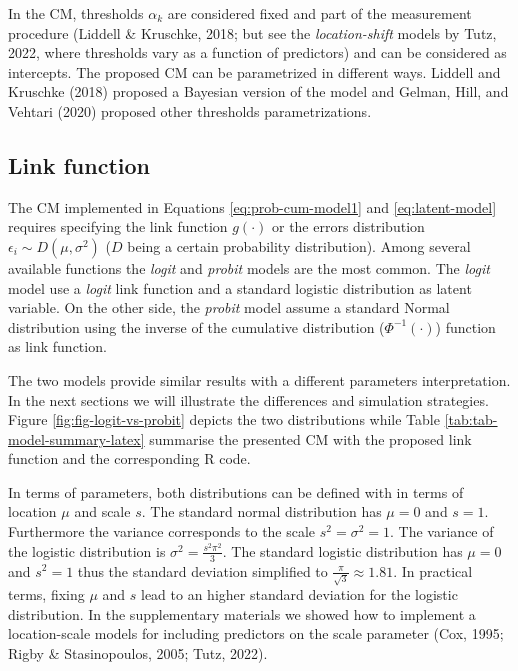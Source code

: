 \documentclass[
  man,floatsintext]{apa6}
\begin{document}
In the CM, thresholds \(\alpha_k\) are considered fixed and part of the measurement procedure (Liddell \& Kruschke, 2018; but see the \emph{location-shift} models by Tutz, 2022, where thresholds vary as a function of predictors) and can be considered as intercepts. The proposed CM can be parametrized in different ways. Liddell and Kruschke (2018) proposed a Bayesian version of the model and Gelman, Hill, and Vehtari (2020) proposed other thresholds parametrizations.

\subsection{Link function}\label{link-function}

The CM implemented in Equations \eqref{eq:prob-cum-model1} and \eqref{eq:latent-model} requires specifying the link function \(g(\cdot)\) or the errors distribution \(\epsilon_i \sim D(\mu, \sigma^2)\) (\(D\) being a certain probability distribution). Among several available functions the \emph{logit} and \emph{probit} models are the most common. The \emph{logit} model use a \emph{logit} link function and a standard logistic distribution as latent variable. On the other side, the \emph{probit} model assume a standard Normal distribution using the inverse of the cumulative distribution (\(\Phi^{-1}(\cdot)\)) function as link function.

The two models provide similar results with a different parameters interpretation. In the next sections we will illustrate the differences and simulation strategies. Figure \ref{fig:fig-logit-vs-probit} depicts the two distributions while Table \ref{tab:tab-model-summary-latex} summarise the presented CM with the proposed link function and the corresponding R code.

In terms of parameters, both distributions can be defined with in terms of location \(\mu\) and scale \(s\). The standard normal distribution has \(\mu = 0\) and \(s = 1\). Furthermore the variance corresponds to the scale \(s^2 = \sigma^2 = 1\). The variance of the logistic distribution is \(\sigma^2 = \frac{s^2\pi^2}{3}\). The standard logistic distribution has \(\mu = 0\) and \(s^2 = 1\) thus the standard deviation simplified to \(\frac{\pi}{\sqrt{3}} \approx 1.81\). In practical terms, fixing \(\mu\) and \(s\) lead to an higher standard deviation for the logistic distribution. In the supplementary materials we showed how to implement a location-scale models for including predictors on the scale parameter (Cox, 1995; Rigby \& Stasinopoulos, 2005; Tutz, 2022).
\end{document}
